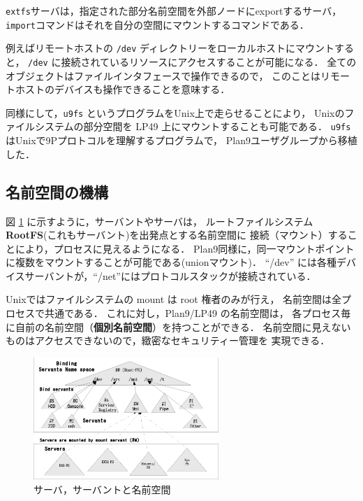 \documentclass{ieicej}
\begin{document}
{\tt extfs}サーバは，指定された部分名前空間を外部ノードにexportするサーバ，
{\tt import}コマンドはそれを自分の空間にマウントするコマンドである．

例えばリモートホストの {\tt /dev} ディレクトリーをローカルホストにマウントすると，
{\tt /dev} に接続されているリソースにアクセスすることが可能になる．
全てのオブジェクトはファイルインタフェースで操作できるので，
このことはリモートホストのデバイスも操作できることを意味する．

同様にして，{\tt u9fs} というプログラムをUnix上で走らせることにより，
Unixのファイルシステムの部分空間を LP49 上にマウントすることも可能である．
{\tt u9fs}はUnixで9Pプロトコルを理解するプログラムで，
Plan9ユーザグループから移植した．


\subsection{名前空間の機構}

図 \ref{fig:NS-server-servant} に示すように，サーバントやサーバは，
ルートファイルシステム{\bf RootFS}(これもサーバント)を出発点とする名前空間に
接続（マウント）することにより，プロセスに見えるようになる．
Plan9同様に，同一マウントポイントに複数をマウントすることが可能である(unionマウント)．
``/dev'' には各種デバイスサーバントが，``/net''にはプロトコルスタックが接続されている．

  Unixではファイルシステムの mount は root 権者のみが行え，
  名前空間は全プロセスで共通である．
  これに対し，Plan9/LP49 の名前空間は，
  各プロセス毎に自前の名前空間（{\bf 個別名前空間}）を持つことができる．
  名前空間に見えないものはアクセスできないので，緻密なセキュリティー管理を
  実現できる．

\begin{figure}[tb]
  \begin{center}
   \includegraphics[width=70mm]{../fig/NS-server-servant.eps}
    \caption{サーバ，サーバントと名前空間}
    \label{fig:NS-server-servant}
  \end{center}
\end{figure}
\end{document}
